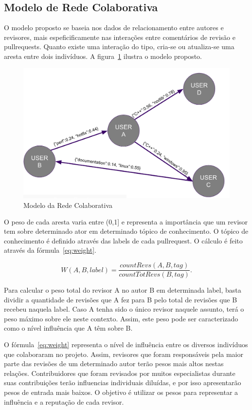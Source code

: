 \documentclass[sigconf]{acmart}
\begin{document}
\subsection{Modelo de Rede Colaborativa}

O modelo proposto se baseia nos dados de relacionamento entre autores e revisores, mais espeficificamente nas interações entre comentários de revisão e pullrequests. Quanto existe uma interação do tipo, cria-se ou atualiza-se uma aresta entre dois indivíduos. A figura~\ref{fig:ger} ilustra o modelo proposto.

\begin{figure}[!htbp]
 \includegraphics[width=\columnwidth]{ger}
 \caption{Modelo da Rede Colaborativa}\label{fig:ger}
\end{figure}

O peso de cada aresta varia entre (0,1] e representa a importância que um revisor tem sobre determinado ator em determinado tópico de conhecimento. O tópico de conhecimento é definido através das labels de cada pullrequest. O cálculo é feito através da fórmula~\ref{eq:weight}.

\begin{equation}\label{eq:weight}
	W(A,B,label) = \dfrac{countRevs(A,B,tag)}{countTotRevs(B, tag)}.
\end{equation}

Para calcular o peso total do revisor A no autor B em determinada label, basta dividir a quantidade de revisões que A fez para B pelo total de revisões que B recebeu naquela label. Caso A tenha sido o único revisor naquele assunto, terá o peso máximo sobre ele neste contexto. Assim, este peso pode ser caracterizado como o nível influência que A têm sobre B.

O fórmula~\ref{eq:weight} representa o nível de influência entre os diversos indivíduos que colaboraram no projeto. Assim, revisores que foram responsáveis pela maior parte das revisões de um determinado autor terão pesos mais altos nestas relações. Contribuidores que foram revisados por muitos especialistas durante suas contribuições terão influencias individuais diluídas, e por isso apresentarão pesos de entrada mais baixos. O objetivo é utilizar os pesos para representar a influência e a reputação de cada revisor.
\end{document}
